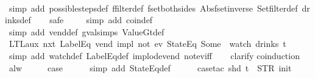\begin{isabellebody}
%
\isadelimproof
\ \ %
\endisadelimproof
%
\isatagproof
{}\isamarkupfalse%
\ {\isacharparenleft}simp\ add{\isacharcolon}\ possible{\isacharunderscore}steps{\isacharunderscore}def\ ffilter{\isacharunderscore}def\ fset{\isacharunderscore}both{\isacharunderscore}sides\ Abs{\isacharunderscore}fset{\isacharunderscore}inverse\ Set{\isachardot}filter{\isacharunderscore}def\ drinks{\isacharunderscore}def{\isacharparenright}\isanewline
\ \ \isamarkupfalse%
\ safe\isanewline
\ \ \ \isamarkupfalse%
\ {\isacharparenleft}simp\ add{\isacharcolon}\ coin{\isacharunderscore}def{\isacharparenright}\isanewline
\ \ \isamarkupfalse%
\ {\isacharparenleft}simp\ add{\isacharcolon}\ vend{\isacharunderscore}def\ gval{\isachardot}simps\ ValueGt{\isacharunderscore}def{\isacharparenright}%
\endisatagproof
{\isafoldproof}%
%
\isadelimproof
\isanewline
%
\endisadelimproof
\isanewline
{}\isamarkupfalse%
\ LTL{\isacharunderscore}aux{}{\isacharcolon}\ {\isachardoublequoteopen}{\isacharparenleft}{\isacharparenleft}nxt\ {\isacharparenleft}LabelEq\ {\isacharprime}{\isacharprime}vend{\isacharprime}{\isacharprime}{\isacharparenright}{\isacharparenright}\ impl\ not\ {\isacharparenleft}ev\ {\isacharparenleft}StateEq\ {\isacharparenleft}Some\ {}{\isacharparenright}{\isacharparenright}{\isacharparenright}{\isacharparenright}\ {\isacharparenleft}watch\ drinks\ t{\isacharparenright}{\isachardoublequoteclose}\isanewline
%
\isadelimproof
\ \ %
\endisadelimproof
%
\isatagproof
{}\isamarkupfalse%
\ {\isacharparenleft}simp\ add{\isacharcolon}\ watch{\isacharunderscore}def\ LabelEq{\isacharunderscore}def\ implode{\isacharunderscore}vend\ not{\isacharunderscore}ev{\isacharunderscore}iff{\isacharparenright}\isanewline
\ \ \isamarkupfalse%
\ clarify\isanewline
{}\isamarkupfalse%
{\isacharparenleft}coinduction{\isacharparenright}\isanewline
\ \ \isamarkupfalse%
\ alw\isanewline
\ \ \isamarkupfalse%
\ \isamarkupfalse%
\ {\isacharquery}case\isanewline
\ \ \ \ \isamarkupfalse%
\ {\isacharparenleft}simp\ add{\isacharcolon}\ StateEq{\isacharunderscore}def{\isacharparenright}\isanewline
\ \ \ \ \isamarkupfalse%
\ {\isacharparenleft}case{\isacharunderscore}tac\ {\isachardoublequoteopen}shd\ t\ {\isacharequal}\ {\isacharparenleft}STR\ {\isacharprime}{\isacharprime}init{\isacharprime}{\isacharprime}{\isacharcomma}\ {\isacharbrackleft}{\isacharbrackright}{\isacharparenright}{\isachardoublequoteclose}{\isacharparenright}\isanewline

\end{isabellebody}
